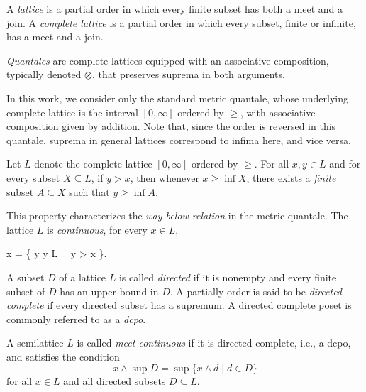 \begin{definition}
   A \emph{lattice} is a partial order in which every finite subset has both a meet and a join. A \emph{complete lattice} is a partial order  in which every subset, finite or infinite, has a meet and a join.
\end{definition}

\begin{definition}
  \emph{Quantales} are complete lattices equipped with an associative composition, typically denoted $\otimes$, that preserves suprema in both arguments.
\end{definition}

\begin{example}
  In this work, we consider only the standard metric quantale, whose underlying complete lattice is the interval $[0, \infty]$ ordered by $\geq$, with associative composition given by addition. Note that, since the order is reversed in this quantale, suprema in general lattices correspond to infima here, and vice versa.
\end{example}


\begin{lemma} \cite{dahlqvist2023syntactic}
Let $L$ denote the complete lattice $[0, \infty]$ ordered by $\geq$.  
For all $x, y \in L$ and for every subset $X \subseteq L$, if $y > x$, then whenever $x \geq \inf X$, there exists a \emph{finite} subset $A \subseteq X$ such that $y \geq \inf A$.

This property characterizes the \emph{way-below relation} in the metric quantale. The lattice $L$ is \emph{continuous}, \ie for every $x \in L$,
	\begin{flalign*}
		x = \inf \{ y  \mid y \in L\  \ y > x \}.
	\end{flalign*}
\end{lemma}


\begin{definition}
  A subset $D$ of a lattice $L$ is called \emph{directed} if it is nonempty and every finite subset of $D$ has an upper bound in $D$. A partially order is said to be \emph{directed complete} if every directed subset has a supremum. A directed complete poset is commonly referred to as a \emph{dcpo}.
\end{definition}

\begin{definition}
  A semilattice $L$ is called \emph{meet continuous} if it is directed complete, i.e., a dcpo, and satisfies the condition
  \[
    x \wedge \sup D = \sup \{x \wedge d \mid d \in D\} \tag{MC}
  \]
  for all $x \in L$ and all directed subsets $D \subseteq L$.
\end{definition}

